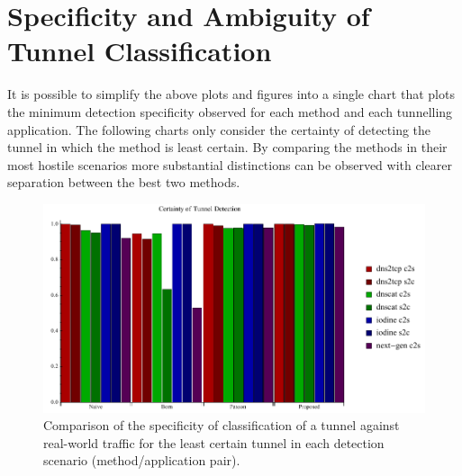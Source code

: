\documentclass{llncs}
\begin{document}
\section{Specificity and Ambiguity of Tunnel Classification}
\label{detection-perf-cert}

It is possible to simplify the above plots and figures into a single chart that
plots the minimum detection specificity observed for each method and each
tunnelling application. The following charts only consider the certainty of
detecting the tunnel in which the method is least certain. By comparing the
methods in their most hostile scenarios more substantial distinctions can be
observed with clearer separation between the best two methods.

\begin{figure}
\centering
\includegraphics[width=\textwidth]{../figures/cplot.pdf}
\caption[Chart of Specificity of Detection by Tunnel Application and Detection
Method]{Comparison of the specificity of classification of a tunnel against
real-world traffic for the least certain tunnel in each detection scenario
(method/application pair).}
\label{cplot}
\end{figure}

\end{document}
